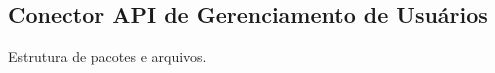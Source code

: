 \begin{apendicesenv}

\partapendices

\chapter{Conector API de Gerenciamento de Usuários}

Estrutura de pacotes e arquivos.



\end{apendicesenv}
